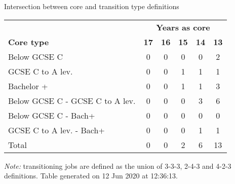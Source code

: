 \begin{center}
\begin{threeparttable}[!h]
\caption{Intersection between core and transition type definitions}
\begin{tabular}{lccccc}
\toprule
\toprule
& \multicolumn{5}{c}{\textbf{Years as core}} \\
\cline{2-6}
\textbf{Core type}&\multicolumn{1}{c}{\textbf{17}}&\multicolumn{1}{c}{\textbf{16}}&\multicolumn{1}{c}{\textbf{15}}&\multicolumn{1}{c}{\textbf{14}}&\multicolumn{1}{c}{\textbf{13}} \\
\midrule
\midrule
Below GCSE C&0&0&0&0&2 \\
GCSE C to A lev.&0&0&1&1&1 \\
Bachelor +&0&0&1&1&3 \\
Below GCSE C - GCSE C to A lev.&0&0&0&3&6 \\
Below GCSE C - Bach+&0&0&0&0&0 \\
GCSE C to A lev. - Bach+&0&0&0&1&1 \\
Total&0&0&2&6&13 \\
\bottomrule
\bottomrule
\end{tabular}
\begin{tablenotes}
\item \footnotesize \textit{Note:} transitioning jobs are defined as the union of 3-3-3, 2-4-3 and 4-2-3 definitions. Table generated on 12 Jun 2020 at 12:36:13.
\end{tablenotes}
\end{threeparttable}
\end{center}
